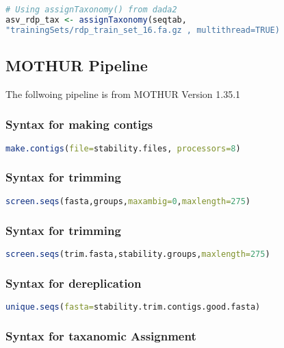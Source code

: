 \begin{lstlisting}[language=R]
# Using assignTaxonomy() from dada2
asv_rdp_tax <- assignTaxonomy(seqtab,
"trainingSets/rdp_train_set_16.fa.gz , multithread=TRUE)
\end{lstlisting}

\subsection*{\newline MOTHUR Pipeline}
The follwoing pipeline is from MOTHUR Version 1.35.1

\subsubsection*{Syntax for making contigs}

\begin{lstlisting}[language=R]
make.contigs(file=stability.files, processors=8)
\end{lstlisting}

\subsubsection*{Syntax for trimming}

\begin{lstlisting}[language=R]
screen.seqs(fasta,groups,maxambig=0,maxlength=275)
\end{lstlisting}

\subsubsection*{Syntax for trimming}

\begin{lstlisting}[language=R]
screen.seqs(trim.fasta,stability.groups,maxlength=275)
\end{lstlisting}

\subsubsection*{Syntax for dereplication}

\begin{lstlisting}[language=R]
unique.seqs(fasta=stability.trim.contigs.good.fasta)
\end{lstlisting}

\subsubsection*{Syntax for taxanomic Assignment}

